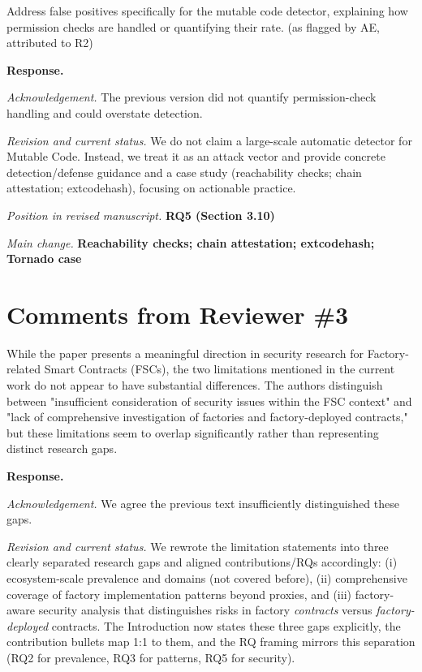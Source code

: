 \documentclass[acmsmall]{acmart}
\begin{document}
	\begin{tcolorbox}
		[commentbox,title=Reviewer \#2 -- Comment 4] Address false positives specifically for the mutable
		code detector, explaining how permission checks are handled or quantifying their rate. (as
		flagged by AE, attributed to R2)
	\end{tcolorbox}

	\noindent
	\textbf{Response.}

	\textit{Acknowledgement.} The previous version did not quantify permission-check handling and could
	overstate detection.

	\textit{Revision and current status.} We do not claim a large-scale automatic detector for
	Mutable Code. Instead, we treat it as an attack vector and provide concrete detection/defense
	guidance and a case study (reachability checks; chain attestation; extcodehash), focusing on actionable
	practice.

	\textit{Position in revised manuscript.} {\color{red}\textbf{RQ5 (Section 3.10)}}

	\textit{Main change.}
	{\color{blue}\textbf{Reachability checks; chain attestation; extcodehash; Tornado case}}

	\newpage
	\section{Comments from Reviewer \#3}

	\begin{tcolorbox}
		[commentbox,title=Reviewer \#3 -- Comment 1] While the paper presents a meaningful direction
		in security research for Factory-related Smart Contracts (FSCs), the two limitations
		mentioned in the current work do not appear to have substantial differences. The authors distinguish
		between "insufficient consideration of security issues within the FSC context" and "lack of
		comprehensive investigation of factories and factory-deployed contracts," but these
		limitations seem to overlap significantly rather than representing distinct research gaps.
	\end{tcolorbox}

	\noindent
	\textbf{Response.}

	\textit{Acknowledgement.} We agree the previous text insufficiently distinguished these gaps.

	\textit{Revision and current status.} We rewrote the limitation statements into three clearly separated
	research gaps and aligned contributions/RQs accordingly: (i) ecosystem-scale prevalence and
	domains (not covered before), (ii) comprehensive coverage of factory implementation patterns beyond
	proxies, and (iii) factory-aware security analysis that distinguishes risks in factory \emph{contracts}
	versus \emph{factory-deployed} contracts. The Introduction now states these three gaps explicitly,
	the contribution bullets map 1:1 to them, and the RQ framing mirrors this separation (RQ2 for
	prevalence, RQ3 for patterns, RQ5 for security).
\end{document}
